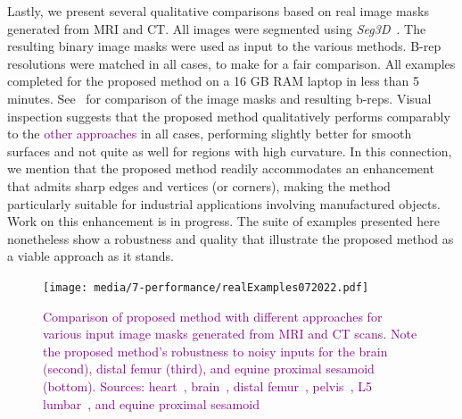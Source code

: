 Lastly, we present several qualitative comparisons based on real image masks generated from MRI and CT.  All images were segmented using \textit{Seg3D}~\cite{Seg3D}. The resulting binary image masks were used as input to the various methods. B-rep resolutions were matched in all cases, to make for a fair comparison. All examples completed for the proposed method on a 16 GB RAM laptop in less than 5 minutes. See~ for comparison of the image masks and resulting b-reps. Visual inspection suggests that the proposed method qualitatively performs comparably to the \textcolor{purple}{other approaches} in all cases, performing slightly better for smooth surfaces and not quite as well for regions with high curvature. In this connection, we mention that the proposed method readily accommodates an enhancement that admits sharp edges and vertices (or corners), making the method particularly suitable for industrial applications involving manufactured objects.  Work on this enhancement is in progress.  The suite of examples presented here nonetheless show a robustness and quality that illustrate the proposed method as a viable approach as it stands. \\
%
\begin{figure}[h!]
	\centering
	 \texttt{[image: media/7-performance/realExamples072022.pdf]}
	\caption{\textcolor{purple}{Comparison of proposed method with different approaches for various input image masks generated from MRI and CT scans. Note the proposed method's robustness to noisy inputs for the brain (second), distal femur (third), and equine proximal sesamoid (bottom). Sources: heart~\cite{cvgg}, brain~\cite{marcus_2007}, distal femur~\cite{epperson_2013}, pelvis~\cite{clark_2013}, L5 lumbar~\cite{yao_2016}, and equine proximal sesamoid~\cite{shaffer2021}}}
	\label{fig:example-meshes}
\end{figure} \\
%

